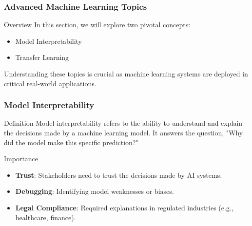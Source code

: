 \documentclass[aspectratio=169]{beamer}
\begin{document}
\begin{frame}[fragile]
    \frametitle{Advanced Machine Learning Topics}
    \begin{block}{Overview}
        In this section, we will explore two pivotal concepts:
        \begin{itemize}
            \item Model Interpretability
            \item Transfer Learning
        \end{itemize}
        Understanding these topics is crucial as machine learning systems are deployed in critical real-world applications.
    \end{block}
\end{frame}

\begin{frame}[fragile]
    \frametitle{Model Interpretability}
    \begin{block}{Definition}
        Model interpretability refers to the ability to understand and explain the decisions made by a machine learning model. It answers the question, "Why did the model make this specific prediction?"
    \end{block}
    
    \begin{block}{Importance}
        \begin{itemize}
            \item \textbf{Trust}: Stakeholders need to trust the decisions made by AI systems.
            \item \textbf{Debugging}: Identifying model weaknesses or biases.
            \item \textbf{Legal Compliance}: Required explanations in regulated industries (e.g., healthcare, finance).
        \end{itemize}
    \end{block}
\end{frame}
\end{document}
